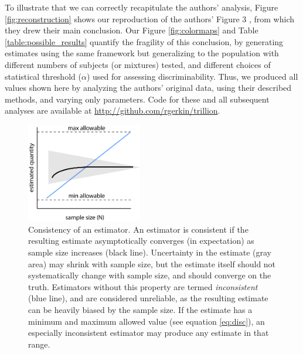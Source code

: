 \documentclass[letterpaper,twocolumn,10pt]{article}
\begin{document}
To illustrate that we can correctly recapitulate the authors' analysis, 
Figure \ref{fig:reconstruction} shows our reproduction of the authors' Figure 3 \cite{bushdid_humans_2014}, 
from which they drew their main conclusion. Our Figure \ref{fig:colormaps} and Table \ref{table:possible_results} quantify the fragility of this conclusion, 
by generating estimates using the same framework but generalizing to the population with different numbers of subjects (or mixtures) tested, 
and different choices of statistical threshold ($\alpha$) used for assessing discriminability.  
Thus, we produced all values shown here by analyzing the authors' original data, using their described methods, and varying only parameters. 
Code for these and all subsequent analyses are available at \url{http://github.com/rgerkin/trillion}. 

\begin{figure}[hbt]
    \includegraphics[width=0.45\textwidth]{figures/Fig1_StatPathology}
    \caption{
Consistency of an estimator. 
An estimator is consistent if the resulting estimate asymptotically converges (in expectation) 
as sample size increases (black line). 
Uncertainty in the estimate (gray area) may shrink with sample size, 
but the estimate itself should not systematically change with sample size, and should converge on the truth. 
Estimators without this property are termed \textit{inconsistent} (blue line), and are considered unreliable, as the resulting estimate can be heavily biased by the sample size.  If the estimate has a minimum and maximum allowed value (see equation \ref{eq:disc}), an especially inconsistent estimator may produce any estimate in that range.  
}
    \label{fig:statpathology}
\end{figure}
\end{document}
